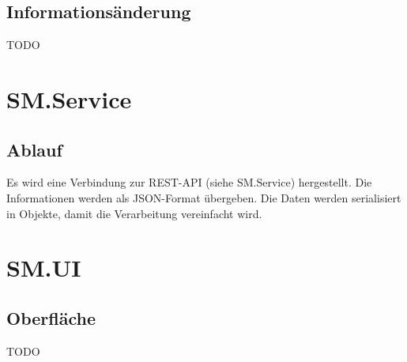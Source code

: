 \documentclass{article}
\begin{document}
\subsection{Informationsänderung}

TODO

\newpage

\section{SM.Service}

\subsection{Ablauf}

Es wird eine Verbindung zur REST-API (siehe SM.Service) hergestellt. Die Informationen werden als JSON-Format übergeben.
Die Daten werden serialisiert in Objekte, damit die Verarbeitung vereinfacht wird.

\newpage

\section{SM.UI}

\subsection{Oberfläche}

TODO
\end{document}
